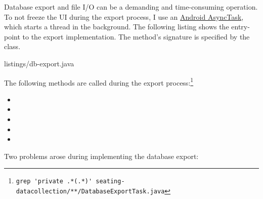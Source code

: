 Database export and file \acs{I/O} can be a demanding and time-consuming
operation.
To not freeze the \acs{UI} during the export process, I use an
\href{https://developer.android.com/reference/android/os/AsyncTask.html}{Android
AsyncTask}, which starts a thread in the background.
The following listing shows the entry-point to the export implementation.
The method's signature is specified by the  class.

%
{listings/db-export.java}

The following methods are called during the export
process:\footnote{\verb~grep 'private .*(.*)' seating-datacollection/**/DatabaseExportTask.java~\shellcmdline}

\begin{itemize}
  \item {}
  \item {}
  \item {}
  \item {}
  \item {}
\end{itemize}

Two problems arose during implementing the database export:

